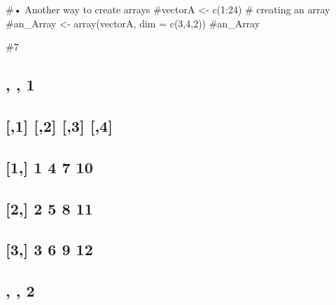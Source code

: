 \documentclass[
]{article}
\begin{document}
\#• Another way to create arrays \#vectorA \textless- c(1:24) \#
creating an array \#an\_Array \textless- array(vectorA, dim = c(3,4,2))
\#an\_Array

\#7

\hypertarget{section-15}{%
\subsection{, , 1}\label{section-15}}

\hypertarget{section-16}{%
\subsection{}\label{section-16}}

\hypertarget{section-17}{%
\subsection{{[},1{]} {[},2{]} {[},3{]} {[},4{]}}\label{section-17}}

\hypertarget{section-18}{%
\subsection{{[}1,{]} 1 4 7 10}\label{section-18}}

\hypertarget{section-19}{%
\subsection{{[}2,{]} 2 5 8 11}\label{section-19}}

\hypertarget{section-20}{%
\subsection{{[}3,{]} 3 6 9 12}\label{section-20}}

\hypertarget{section-21}{%
\subsection{}\label{section-21}}

\hypertarget{section-22}{%
\subsection{, , 2}\label{section-22}}

\hypertarget{section-23}{%
\subsection{}\label{section-23}}
\end{document}
